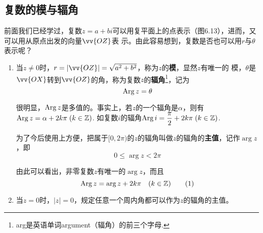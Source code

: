 \subsection{复数的模与辐角}

前面我们已经学过，复数$z=a+bi$可以用复平面上的点表示（图6.13），进而，又可以用从原点出发的向量$\vv{OZ}$表
示。由此容易想到，复数是否也可以用$r$与$\theta$表示呢？

\begin{figure}[htp]
    \centering
{}
    \caption{}
\end{figure}

\begin{enumerate}
    \item 当$z\ne 0$时，$r=|\vv{OZ}|=\sqrt{a^2+b^2}$，称为$z$的\textbf{模}，显然$z$有唯一的
    模，$\theta$是$\vv{OX}$转到$\vv{OZ}$的角，称为复数$z$的\textbf{辐角}\footnote{arg是英语单词argument（辐角）的前三个字母.}，记为
 \[   {\rm Arg\,} z=\theta\]

    很明显，${\rm Arg\,}z$是多值的。事实上，若$z$的一个辐角是$\alpha$，则有${\rm Arg\,}z=\alpha+2k\pi\; (k\in\mathbb{Z})$. 如复数$i$的辐角${\rm Arg\,}i=\dfrac{\pi}{2}+2k\pi\; (k\in\mathbb{Z})$.

    为了今后使用上方便，把属于$[0,2\pi)$的$z$的辐角叫做$z$的辐角的\textbf{主值}，记作$\arg z$，即
    \[0\le \arg z<2\pi\]

    由此可以看出，非零复数$z$有唯一的$\arg z$，而且
\begin{equation}
     {\rm Arg\,}z=\arg z+2k\pi\quad (k\in\mathbb{Z})\tag{1}
\end{equation}
    \item 当$z=0$时，$|z|=0$，规定任意一个周内角都可以作为$z$的辐角的主值。
\end{enumerate}

